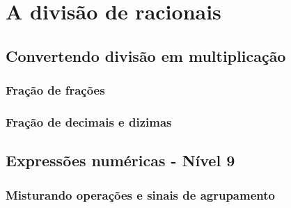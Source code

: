 \chapter[A divisão de racionais]{A divisão de racionais}

\section{Convertendo divisão em multiplicação}

\subsection{Fração de frações}

\subsection{Fração de decimais e dizimas}

\section{Expressões numéricas - Nível 9}

\subsection{Misturando operações e sinais de agrupamento}